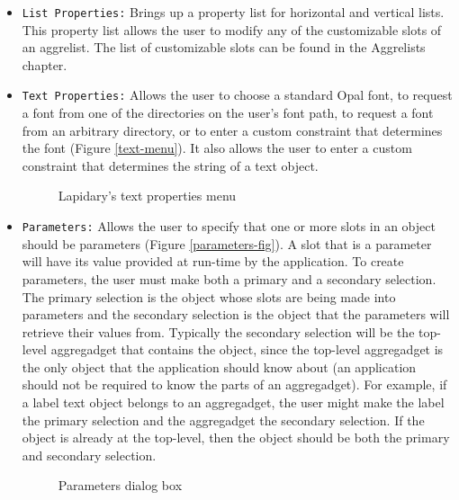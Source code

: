 \begin{itemize}
\item {}
{\tt List Properties:} Brings up a property list for horizontal and vertical
lists. This property list allows the user to modify any of the customizable
slots of an aggrelist. The list of customizable slots can be found in
the Aggrelists chapter.

\item {}

{\tt Text Properties:} Allows the user to choose a standard Opal font,
to request a font from one of the directories on the user's font path,
to request a font from an arbitrary directory, or to enter a custom
constraint that determines the font (Figure \ref{text-menu}).
It also allows the user to enter a custom constraint that determines the
string of a text object.

\begin{figure}
\begin{center}
\end{center}
\caption{Lapidary's text properties menu}
\end{figure}


\item {}

\label{parameters}
{\tt Parameters:} Allows the user to specify that
one or more slots in an object should be parameters
(Figure \ref{parameters-fig}). A slot that is a parameter will have
its value provided at run-time by the application.
To create parameters, the user must make both a primary and a secondary
selection. The primary selection is the object whose slots are being
made into parameters and the secondary selection is the object that
the parameters will retrieve their values from. Typically the secondary
selection will be the top-level aggregadget that contains the object,
since the top-level aggregadget is the only object that the application
should know about (an application should not be required to know the parts
of an aggregadget). For example, if a
label text object belongs to an aggregadget, the user might make the label
the primary selection and the aggregadget the secondary selection.
If the object is already at the top-level, then the
object should be both the primary and secondary selection.

\begin{figure}
\begin{center}
\end{center}
\caption{Parameters dialog box}
\end{figure}


\end{itemize}
